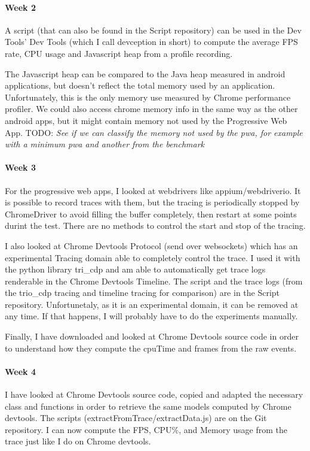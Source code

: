 \documentclass{kththesis}
\begin{document}
\paragraph{Week 2}
 A script (that can also be found in the Script repository) can be used in the Dev Tools' Dev Tools (which I call devception in short) to compute the average FPS rate, CPU usage and Javascript heap from a profile recording.

The Javascript heap can be compared to the Java heap measured in android applications, but doesn't reflect the total memory used by an application. Unfortunately, this is the only memory use measured by Chrome performance profiler. We could also access chrome memory info in the same way as the other android apps, but it might contain memory not used by the Progressive Web App.
\newline
TODO: 
\textit{See if we can classify the memory not used by the pwa, for example with a minimum pwa and another from the benchmark}
\paragraph{Week 3}
For the progressive web apps, I looked at webdrivers like appium/webdriverio. It is possible to record traces with them, but the tracing is periodically stopped by ChromeDriver to avoid filling the buffer completely, then restart at some points durint the test. There are no methods to control the start and stop of the tracing.  

I also looked at Chrome Devtools Protocol (send over websockets) which has an experimental Tracing domain able to completely control the trace. I used it with the python library tri\_cdp and am able to automatically get trace logs renderable in the Chrome Devtools Timeline. The script and the trace logs (from the trio\_cdp tracing and timeline tracing for comparison) are in the Script repository. 
Unfortunetaly, as it is an experimental domain, it can be removed at any time. If that happens, I will probably have to do the experiments manually.

Finally, I have downloaded and looked at Chrome Devtools source code in order to understand how they compute the cpuTime and frames from the raw events.
\paragraph{Week 4}
I have looked at Chrome Devtools source code, copied and adapted the necessary class and functions in order to retrieve the same models computed by Chrome devtools. The scripts (extractFromTrace/extractData.js) are on the Git repository. I can now compute the FPS, CPU\%, and Memory usage from the trace just like I do on Chrome devtools.
\end{document}
